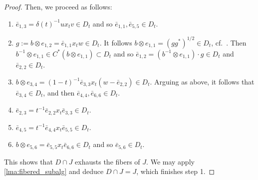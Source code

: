 \documentclass{amsart}
\theoremstyle{definition}
\begin{document}
\begin{proof}
    Then, we proceed as follows:
    \begin{enumerate}[1. ]
        \item
        $\bar{e}_{1,3} = \delta(t)^{-1}ux_tv\in D_t$ and so $\bar{e}_{1,1},\bar{e}_{5,5}\in D_t$.
        \item
        $g:=b\otimes e_{1,2} = \bar{e}_{1,1}x_tw\in D_t$.
         It follows $b\otimes e_{1,1}=(gg^*)^{1/2}\in D_t$, cf.\  \cite{OlsZam1976}.
        Then $b^{-1}\otimes e_{1,1}\in C^{*}(b\otimes e_{1,1})\subset D_t$ and so $\bar{e}_{1,2}=(b^{-1}\otimes e_{1,1})\cdot g\in D_t$
        and $\bar{e}_{2,2}\in D_t$.
        \item
        $b\otimes e_{3,4} = (1-t)^{-1}\bar{e}_{3,3}x_t(w-\bar{e}_{2,2})\in D_t$.
        Arguing as above, it follows that $\bar{e}_{3,4}\in D_t$, and then $\bar{e}_{4,4},\bar{e}_{6,6}\in D_t$.
        \item
        $\bar{e}_{2,3} = t^{-1}\bar{e}_{2,2}x_t\bar{e}_{3,3}\in D_t$.
        \item
        $\bar{e}_{4,5} = t^{-1}\bar{e}_{4,4}x_t\bar{e}_{5,5}\in D_t$.
        \item
        $b\otimes e_{5,6} = \bar{e}_{5,5}x_t\bar{e}_{6,6}\in D_t$ and so $\bar{e}_{5,6}\in D_t$.
    \end{enumerate}

    This shows that $D\cap J$ exhausts the fibers of $J$.
    We may apply \autoref{lma:fibered_subalg} and deduce $D\cap J=J$, which finishes step 1.


\end{proof}
\end{document}
